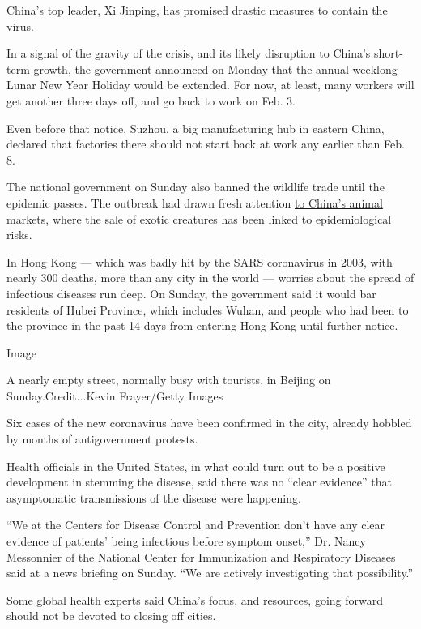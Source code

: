 China's top leader, Xi Jinping, has promised drastic measures to contain
the virus.

In a signal of the gravity of the crisis, and its likely disruption to
China's short-term growth, the
\href{https://news.sina.com.cn/c/2020-01-27/doc-iihnzahk6491235.shtml}{government
announced on Monday} that the annual weeklong Lunar New Year Holiday
would be extended. For now, at least, many workers will get another
three days off, and go back to work on Feb. 3.

Even before that notice, Suzhou, a big manufacturing hub in eastern
China, declared that factories there should not start back at work any
earlier than Feb. 8.

The national government on Sunday also banned the wildlife trade until
the epidemic passes. The outbreak had drawn fresh attention
\href{https://www.nytimes3xbfgragh.onion/2020/01/25/world/asia/china-markets-coronavirus-sars.html}{to
China's animal markets}, where the sale of exotic creatures has been
linked to epidemiological risks.

In Hong Kong --- which was badly hit by the SARS coronavirus in 2003,
with nearly 300 deaths, more than any city in the world --- worries
about the spread of infectious diseases run deep. On Sunday, the
government said it would bar residents of Hubei Province, which includes
Wuhan, and people who had been to the province in the past 14 days from
entering Hong Kong until further notice.

Image

A nearly empty street, normally busy with tourists, in Beijing on
Sunday.Credit...Kevin Frayer/Getty Images

Six cases of the new coronavirus have been confirmed in the city,
already hobbled by months of antigovernment protests.

Health officials in the United States, in what could turn out to be a
positive development in stemming the disease, said there was no ``clear
evidence'' that asymptomatic transmissions of the disease were
happening.

``We at the Centers for Disease Control and Prevention don't have any
clear evidence of patients' being infectious before symptom onset,'' Dr.
Nancy Messonnier of the National Center for Immunization and Respiratory
Diseases said at a news briefing on Sunday. ``We are actively
investigating that possibility.''

Some global health experts said China's focus, and resources, going
forward should not be devoted to closing off cities.

